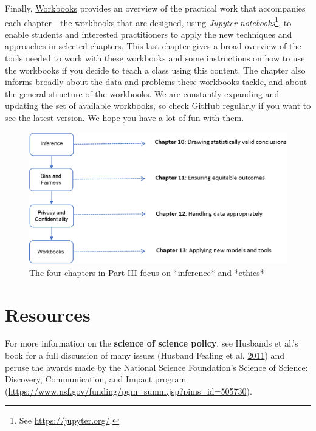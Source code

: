 \documentclass[]{krantz}
\begin{document}
Finally, \protect\hyperlink{chap:workbooks}{Workbooks} provides an
overview of the practical work that accompanies each chapter---the
workbooks that are designed, using \emph{Jupyter notebooks}\footnote{See
  \url{https://jupyter.org/}.}, to enable students and interested
practitioners to apply the new techniques and approaches in selected
chapters. This last chapter gives a broad overview of the tools needed
to work with these workbooks and some instructions on how to use the
workbooks if you decide to teach a class using this content. The chapter
also informs broadly about the data and problems these workbooks tackle,
and about the general structure of the workbooks. We are constantly
expanding and updating the set of available workbooks, so check GitHub
regularly if you want to see the latest version. We hope you have a lot
of fun with them.

\begin{figure}

{\centering \includegraphics[width=0.9\linewidth]{ChapterIntro/figures/Figure4_new} 

}

\caption{The four chapters in Part III focus on *inference* and *ethics*}\label{fig:fig5}
\end{figure}

\section{Resources}\label{sec:intro:resources}

For more information on the \textbf{science of science policy}, see
Husbands et al.'s book for a full discussion of many issues (Husband
Fealing et al. \protect\hyperlink{ref-husband2011science}{2011}) and
peruse the awards made by the National Science Foundation's Science of
Science: Discovery, Communication, and Impact program
(\url{https://www.nsf.gov/funding/pgm_summ.jsp?pims_id=505730}).
\end{document}
